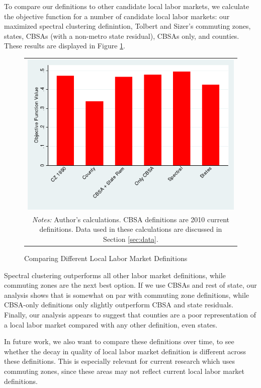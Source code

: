 To compare our definitions to other candidate local labor markets, we calculate the objective function for a number of candidate local labor markets: our maximized spectral clustering definintion, Tolbert and Sizer's commuting zones, states, CBSAs (with a non-metro state residual), CBSAs only, and counties. These results are displayed in Figure \ref{fig:objfn_results}.

\begin{figure}\centering
\caption{Comparing Different Local Labor Market Definitions}
\begin{tabular}{c}
\includegraphics[scale=0.45]{./figures/objectivefunction_defns.png}\\
\multicolumn{1}{p{4.5in}}{\footnotesize \emph{Notes:} Author's calculations. CBSA definitions are 2010 current definitions. Data used in these calculations are discussed in Section \ref{sec:data}.}
\end{tabular}
\label{fig:objfn_results}
\end{figure}

Spectral clustering outperforms all other labor market definitions, while commuting zones are the next best option. If we use CBSAs and rest of state, our analysis shows that is somewhat on par with commuting zone definitions, while CBSA-only definitions only slightly outperform CBSA and state residuals. Finally, our analysis appears to suggest that counties are a poor representation of a local labor market compared with any other definition, even states.

In future work, we also want to compare these definitions over time, to see whether the decay in quality of local labor market definition is different across these definitions. This is especially relevant for current research which uses commuting zones, since these areas may not reflect current local labor market definitions.
